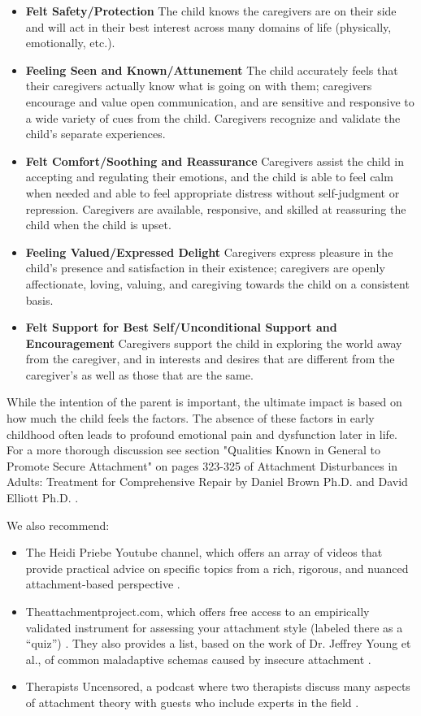 \documentclass[12pt,letterpaper]{article}
\begin{document}
\begin{itemize}
    \item \textbf{Felt Safety/Protection} The child knows the caregivers are on their side and will act in their best interest across many domains of life (physically, emotionally, etc.).
    \item \textbf{Feeling Seen and Known/Attunement} The child accurately feels that their caregivers actually know what is going on with them; caregivers encourage and value open communication, and are sensitive and responsive to a wide variety of cues from the child. Caregivers recognize and validate the child's separate experiences.
    \item \textbf{Felt Comfort/Soothing and Reassurance} Caregivers assist the child in accepting and regulating their emotions, and the child is able to feel calm when needed and able to feel appropriate distress without self-judgment or repression. Caregivers are available, responsive, and skilled at reassuring the child when the child is upset.
    \item \textbf{Feeling Valued/Expressed Delight} Caregivers express pleasure in the child's presence and satisfaction in their existence; caregivers are openly affectionate, loving, valuing, and caregiving towards the child on a consistent basis.
    \item \textbf{Felt Support for Best Self/Unconditional Support and Encouragement} Caregivers support the child in exploring the world away from the caregiver, and in interests and desires that are different from the caregiver's as well as those that are the same.
\end{itemize}

While the intention of the parent is important, the ultimate impact is based on how much the child feels the factors. The absence of these factors in early childhood often leads to profound emotional pain and dysfunction later in life. For a more thorough discussion see section "Qualities Known in General to Promote Secure Attachment" on pages 323-325 of Attachment Disturbances in Adults: Treatment for Comprehensive Repair by Daniel Brown Ph.D. and David Elliott Ph.D. \cite{brownAttachmentDisturbances}.  

We also recommend:
\begin{itemize}
    \item The Heidi Priebe Youtube channel, which offers an array of videos that provide practical advice on specific topics from a rich, rigorous, and nuanced attachment-based perspective \cite{priebeYoutube}.
    \item Theattachmentproject.com, which offers free access to an empirically validated instrument for assessing your attachment style (labeled there as a “quiz”) \cite{attachmentProject}. They also provides a list, based on the work of Dr. Jeffrey Young et al., of common maladaptive schemas caused by insecure attachment \cite{earlyMalSchemas}.
    \item Therapists Uncensored, a podcast where two therapists discuss many aspects of attachment theory with guests who include experts in the field \cite{therapistsUncensored}.
\end{itemize}
\end{document}
